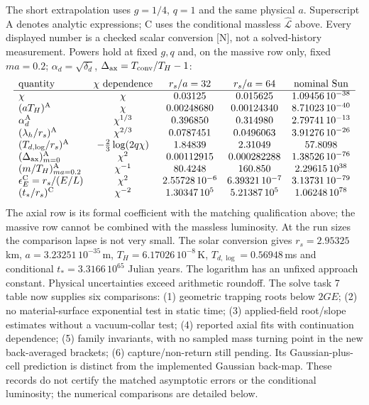The short extrapolation uses $g=1/4$, $q=1$ and the same physical $a$.
Superscript A denotes analytic expressions; C uses the conditional
massless $\widehat{\mathcal L}$ above. Every displayed number is a checked
scalar conversion [N], not a solved-history measurement. Powers hold at
fixed $g,q$ and, on the massive row only, fixed $ma=0.2$;
$\alpha_d=\sqrt{\delta_d}$, $\Delta_{\rm ax}=T_{\rm conv}/T_H-1$:
\[
\begin{array}{lcccc}
 \text{quantity}&\chi\text{ dependence}&r_s/a=32&r_s/a=64&\text{nominal Sun}\\ \hline
 \chi&\chi&0.03125&0.015625&1.09456\,10^{-38}\\
 (aT_H)^{\rm A}&\chi&0.00248680&0.00124340&8.71023\,10^{-40}\\
 \alpha_d^{\rm A}&\chi^{1/3}&0.396850&0.314980&2.79741\,10^{-13}\\
 (\lambda_h/r_s)^{\rm A}&\chi^{2/3}&0.0787451&0.0496063&3.91276\,10^{-26}\\
 (T_{d,\log}/r_s)^{\rm A}&-\tfrac23\log(2q\chi)&1.84839&2.31049&57.8098\\
 (\Delta_{\rm ax})^{\rm A}_{m=0}&\chi^2&0.00112915&0.000282288&1.38526\,10^{-76}\\
 (m/T_H)^{\rm A}_{ma=0.2}&\chi^{-1}&80.4248&160.850&2.29615\,10^{38}\\
 \epsilon_E^{\rm C}=r_s/(E/L)&\chi^2&2.55728\,10^{-6}&6.39321\,10^{-7}&3.13731\,10^{-79}\\
 (t_*/r_s)^{\rm C}&\chi^{-2}&1.30347\,10^5&5.21387\,10^5&1.06248\,10^{78}
\end{array}
\]
The axial row is its formal coefficient with the matching qualification
above; the massive row cannot be combined with the massless luminosity.
At the run sizes the comparison lapse is not very small. The solar
conversion gives $r_s=2.95325\,$km, $a=3.23251\,10^{-35}\,$m,
$T_H=6.17026\,10^{-8}\,$K, $T_{d,\log}=0.56948\,$ms and conditional
$t_*=3.3166\,10^{65}$ Julian years. The logarithm has an unfixed approach
constant. Physical uncertainties exceed arithmetic roundoff. The solve
task 7 table now supplies six comparisons: (1) geometric trapping roots
below $2GE$; (2) no material-surface exponential test in static time;
(3) applied-field root/slope estimates without a vacuum-collar test;
(4) reported axial fits with continuation dependence; (5) family
invariants, with no sampled mass turning point in the new back-averaged
brackets; (6) capture/non-return still pending. Its Gaussian-plus-cell
prediction is distinct from the implemented Gaussian back-map.
These records do not certify the matched asymptotic errors or the
conditional luminosity; the numerical comparisons are detailed below.

